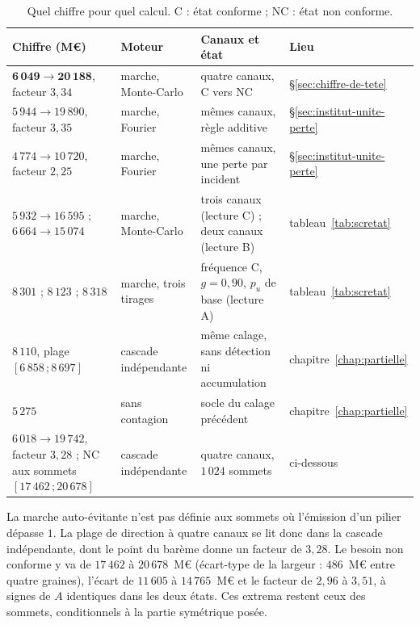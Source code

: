 \begin{table}[H]\centering\footnotesize
\renewcommand{\arraystretch}{1.2}
\begin{tabular}{@{}>{\raggedright\arraybackslash}p{4.2cm} >{\raggedright\arraybackslash}p{3.0cm} >{\raggedright\arraybackslash}p{5.4cm} l@{}}
\toprule
\textbf{Chiffre (M\euro)} & \textbf{Moteur} & \textbf{Canaux et état} & \textbf{Lieu} \\
\midrule
$\mathbf{6\,049\to20\,188}$, facteur $3{,}34$ & marche, Monte-Carlo & quatre canaux, C vers NC & \S\ref{sec:chiffre-de-tete} \\
$5\,944\to19\,890$, facteur $3{,}35$ & marche, Fourier & mêmes canaux, règle additive & \S\ref{sec:institut-unite-perte} \\
$4\,774\to10\,720$, facteur $2{,}25$ & marche, Fourier & mêmes canaux, une perte par incident & \S\ref{sec:institut-unite-perte} \\
$5\,932\to16\,595$ ; $6\,664\to15\,074$ & marche, Monte-Carlo & trois canaux (lecture C) ; deux canaux (lecture B) & tableau~\ref{tab:scretat} \\
$8\,301$ ; $8\,123$ ; $8\,318$ & marche, trois tirages & fréquence C, $g=0{,}90$, $p_u$ de base (lecture A) & tableau~\ref{tab:scretat} \\
$8\,110$, plage $[6\,858\,;8\,697]$ & cascade indépendante & même calage, sans détection ni accumulation & chapitre~\ref{chap:partielle} \\
$5\,275$ & sans contagion & socle du calage précédent & chapitre~\ref{chap:partielle} \\
$6\,018\to19\,742$, facteur $3{,}28$ ; NC aux sommets $[17\,462\,;20\,678]$ & cascade indépendante & quatre canaux, $1\,024$ sommets & ci-dessous \\
\bottomrule
\end{tabular}
\caption{Quel chiffre pour quel calcul. C : état conforme ; NC : état non conforme.}
\label{tab:quel-chiffre}
\end{table}

La marche auto-évitante n'est pas définie aux sommets où l'émission d'un pilier dépasse $1$. La plage de direction à quatre canaux se lit donc dans la cascade indépendante, dont le point du barème donne un facteur de $3{,}28$. Le besoin non conforme y va de $17\,462$ à $20\,678$~M\euro{} (écart-type de la largeur : $486$~M\euro{} entre quatre graines), l'écart de $11\,605$ à $14\,765$~M\euro{} et le facteur de $2{,}96$ à $3{,}51$, à signes de $A$ identiques dans les deux états. Ces extrema restent ceux des sommets, conditionnels à la partie symétrique posée.

